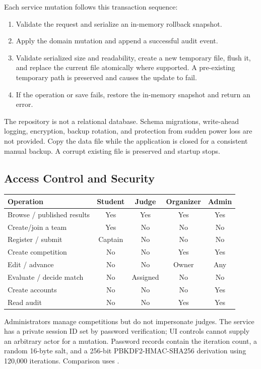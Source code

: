 Each service mutation follows this transaction sequence:
\begin{enumerate}
\item Validate the request and serialize an in-memory rollback snapshot.
\item Apply the domain mutation and append a successful audit event.
\item Validate serialized size and readability, create a new temporary file, flush it, and replace the current file atomically where supported. A pre-existing temporary path is preserved and causes the update to fail.
\item If the operation or save fails, restore the in-memory snapshot and return an error.
\end{enumerate}
The repository is not a relational database. Schema migrations, write-ahead logging, encryption, backup rotation, and protection from sudden power loss are not provided. Copy the data file while the application is closed for a consistent manual backup. A corrupt existing file is preserved and startup stops.
\subsection{Access Control and Security}
\begin{tabularx}{\linewidth}{Ycccc}\toprule Operation & Student & Judge & Organizer & Admin\\\midrule
Browse / published results & Yes & Yes & Yes & Yes\\
Create/join a team & Yes & No & No & No\\
Register / submit & Captain & No & No & No\\
Create competition & No & No & Yes & Yes\\
Edit / advance & No & No & Owner & Any\\
Evaluate / decide match & No & Assigned & No & No\\
Create accounts & No & No & No & Yes\\
Read audit & No & No & Yes & Yes\\\bottomrule\end{tabularx}
Administrators manage competitions but do not impersonate judges. The service has a private session ID set by password verification; UI controls cannot supply an arbitrary actor for a mutation. Password records contain the iteration count, a random 16-byte salt, and a 256-bit PBKDF2-HMAC-SHA256 derivation using 120,000 iterations. Comparison uses .

